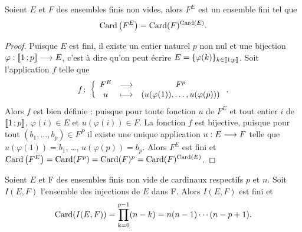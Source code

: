 \begin{theo}
  Soient \(E\) et \(F\) des ensembles finis non vides, alors \(F^E\) est un 
  ensemble fini tel que
  \begin{equation}
    \operatorname{Card}\left(F^E\right)=\operatorname{Card}(F)^{\operatorname{Card}(E)}.
  \end{equation}
\end{theo}

\begin{proof}
  Puisque \(E\) est fini, il existe un entier naturel \(p\) non nul et une 
  bijection \(\varphi:\mathopen{\llbracket}1\mathclose{}\mathpunct{};p\mathclose{\rrbracket} \longrightarrow E\), c'est à dire 
  qu'on peut écrire \(E = \{\varphi(k)\}_{k\in\mathopen{\llbracket}1\mathclose{}\mathpunct{};p\mathclose{\rrbracket}}\). Soit 
  l'application \(f\) telle que
  \begin{equation}
    f\colon \left\{\begin{array}{ccc} F^E & \longrightarrow &F^p\\ u & \longmapsto & (u(\varphi(1)), \ldots, u(\varphi(p))) \end{array} \right..
  \end{equation}
  Alors \(f\) est bien définie : puisque pour toute fonction \(u\) de \(F^E\) et 
  tout entier \(i\) de \(\mathopen{\llbracket}1\mathclose{}\mathpunct{};p\mathclose{\rrbracket}\), \(\varphi(i) \in E\) et 
  \(u(\varphi(i))\in F\). La fonction \(f\) est bijective, puisque pour tout 
  \((b_1, \ldots, b_p) \in F^P\) il existe une unique application 
  \(u:E \longrightarrow F\) telle que \(u(\varphi(1))=b_1\), \ldots, 
  \(u(\varphi(p))=b_p\). Alors \(F^E\) est fini et 
  \(\operatorname{Card}\left(F^E\right)=\operatorname{Card}(F^p)=\operatorname{Card}(F)^p = \operatorname{Card}(F)^{\operatorname{Card}(E)}\).
\end{proof}

\begin{prop}
  \label{prop:nbinj}
  Soient \(E\) et F des ensembles finis non vide de cardinaux respectifs \(p\) 
  et \(n\). Soit \(I(E, F)\) l'ensemble des injections de \(E\) dans F. Alors 
  \(I(E, F)\) est fini et
  \begin{equation}
    \operatorname{Card}(I(E, F))=\prod_{k = 0}^{p - 1}(n - k)=n(n - 1) \dotsm (n - p + 1).
  \end{equation}
\end{prop}


